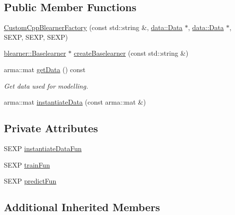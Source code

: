 \subsection*{Public Member Functions}
\begin{DoxyCompactItemize}
\item 
\mbox{\hyperlink{classblearnerfactory_1_1_custom_cpp_blearner_factory_a390de0fb001434b3252e5f723c55d7b3}{Custom\+Cpp\+Blearner\+Factory}} (const std\+::string \&, \mbox{\hyperlink{classdata_1_1_data}{data\+::\+Data}} $\ast$, \mbox{\hyperlink{classdata_1_1_data}{data\+::\+Data}} $\ast$, S\+E\+XP, S\+E\+XP, S\+E\+XP)
\item 
\mbox{\hyperlink{classblearner_1_1_baselearner}{blearner\+::\+Baselearner}} $\ast$ \mbox{\hyperlink{classblearnerfactory_1_1_custom_cpp_blearner_factory_ac98fae043e6822605261c7c6f7125e8c}{create\+Baselearner}} (const std\+::string \&)
\item 
arma\+::mat \mbox{\hyperlink{classblearnerfactory_1_1_custom_cpp_blearner_factory_a29cc0d142660d6e52245c264f71dd651}{get\+Data}} () const
\begin{DoxyCompactList}\small\item\em Get data used for modelling. \end{DoxyCompactList}\item 
arma\+::mat \mbox{\hyperlink{classblearnerfactory_1_1_custom_cpp_blearner_factory_abc9c251017197087af3ef8a1c0421969}{instantiate\+Data}} (const arma\+::mat \&)
\end{DoxyCompactItemize}
\subsection*{Private Attributes}
\begin{DoxyCompactItemize}
\item 
S\+E\+XP \mbox{\hyperlink{classblearnerfactory_1_1_custom_cpp_blearner_factory_aa9264dd28d1046cef3d38d531e065bc0}{instantiate\+Data\+Fun}}
\item 
S\+E\+XP \mbox{\hyperlink{classblearnerfactory_1_1_custom_cpp_blearner_factory_aad89a4d126b8b3e5ac0b6bca98074193}{train\+Fun}}
\item 
S\+E\+XP \mbox{\hyperlink{classblearnerfactory_1_1_custom_cpp_blearner_factory_aa17d2f6ba9b64a6908548b017242d24e}{predict\+Fun}}
\end{DoxyCompactItemize}
\subsection*{Additional Inherited Members}


